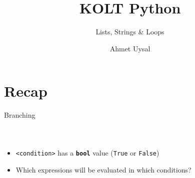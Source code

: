 
\usepackage{../KU-Beamer-Template/style/koc} 
\usepackage{minted}
\usepackage{upquote}
\usepackage{graphicx}

\title{KOLT Python} 
\subtitle{Lists, Strings \& Loops} 
\date{}
\author{Ahmet Uysal}





    \maketitle


    \section{Recap}

        \begin{frame}{Branching}
            \vspace{-3mm}
            \begin{columns}
                \inputminted[firstline=1, lastline=4, frame=single,framesep=2pt]{python3}{../Lecture2/code-examples/branching.py}
                \inputminted[firstline=6, lastline=13, frame=single,framesep=2pt]{python3}{../Lecture2/code-examples/branching.py}
                \inputminted[firstline=15, lastline=27, frame=single,framesep=2pt]{python3}{../Lecture2/code-examples/branching.py}
            \end{columns}
            \begin{itemize}
                \item \texttt{<condition>} has a \textbf{\texttt{bool}} value (\texttt{True} or \texttt{False})
                \item Which expressions will be evaluated in which conditions?
            \end{itemize}
        \end{frame}

